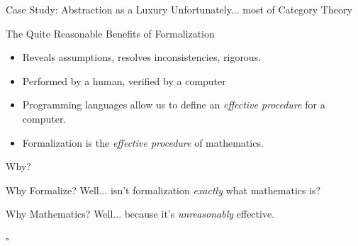 \documentclass{beamer}
\begin{document}
\begin{frame}{Case Study: Abstraction as a Luxury}
  \centering
  \Large{Unfortunately... \pause most of Category Theory}
\end{frame}

\begin{frame}{The Quite Reasonable Benefits of Formalization}
  \begin{itemize}
    \item Reveals assumptions, resolves inconsistencies, rigorous.
    \pause
    \item Performed by a human, verified by a computer
    \pause
    \item Programming languages allow us to define an 
      \textit{effective procedure} for a computer.
    \pause
    \item Formalization is the \textit{effective procedure} of mathematics.
  \end{itemize}
\end{frame}

\begin{frame}{Why?}
  \pause
  \begin{block}{Why Formalize?}
    Well... \pause isn't formalization \textit{exactly} what mathematics is?
  \end{block}
  \pause
  \begin{block}{Why Mathematics?}
    Well... \pause because it's \textit{unreasonably} effective.
  \end{block}
  \pause
  \hfill $\square$
\end{frame}
\end{document}
